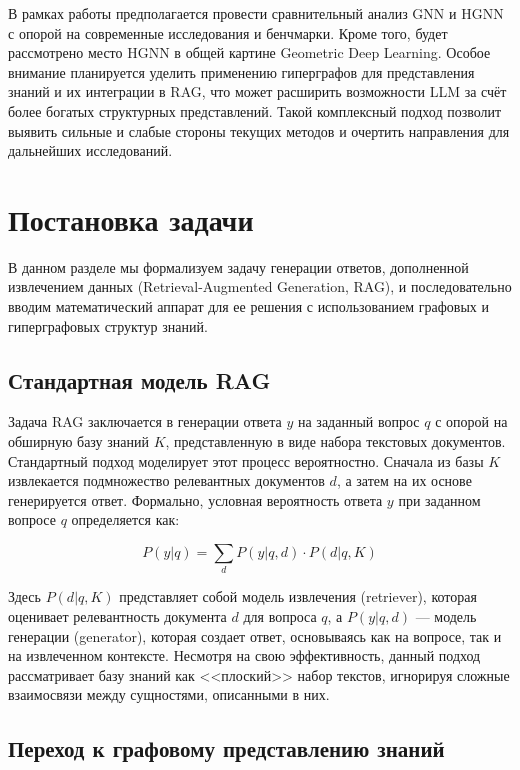 \documentclass{article}
\begin{document}
В рамках работы предполагается провести сравнительный анализ GNN и HGNN с опорой на современные исследования и бенчмарки. Кроме того, будет рассмотрено место HGNN в общей картине Geometric Deep Learning. Особое внимание планируется уделить применению гиперграфов для представления знаний и их интеграции в RAG, что может расширить возможности LLM за счёт более богатых структурных представлений. Такой комплексный подход позволит выявить сильные и слабые стороны текущих методов и очертить направления для дальнейших исследований.

\section{Постановка задачи}

В данном разделе мы формализуем задачу генерации ответов, дополненной извлечением данных (Retrieval-Augmented Generation, RAG), и последовательно вводим математический аппарат для ее решения с использованием графовых и гиперграфовых структур знаний.

\subsection{Стандартная модель RAG}

Задача RAG заключается в генерации ответа $y$ на заданный вопрос $q$ с опорой на обширную базу знаний $K$, представленную в виде набора текстовых документов. Стандартный подход моделирует этот процесс вероятностно. Сначала из базы $K$ извлекается подмножество релевантных документов $d$, а затем на их основе генерируется ответ. Формально, условная вероятность ответа $y$ при заданном вопросе $q$ определяется как:

\begin{equation}
P(y|q) = \sum_d P(y|q,d) \cdot P(d|q,K)
\label{eq:rag_standard}
\end{equation}

Здесь $P(d|q,K)$ представляет собой модель извлечения (retriever), которая оценивает релевантность документа $d$ для вопроса $q$, а $P(y|q,d)$ — модель генерации (generator), которая создает ответ, основываясь как на вопросе, так и на извлеченном контексте. Несмотря на свою эффективность, данный подход рассматривает базу знаний как <<плоский>> набор текстов, игнорируя сложные взаимосвязи между сущностями, описанными в них.

\subsection{Переход к графовому представлению знаний}
\end{document}
